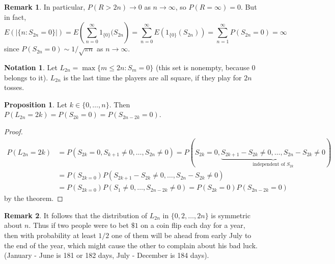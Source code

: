 \documentclass{article}
\theoremstyle{definition}
\newtheorem{proposition}[theorem]{Proposition}
\newtheorem*{remark}{Remark}
\newtheorem*{notation}{Notation}
\begin{document}
\begin{remark}
In particular, $P(R > 2n) \to 0$ as $n \to \infty$, so $P(R = \infty) = 0$. But in fact,
\[
    E(|\{n : S_{2n} = 0\}|) = E\left(\sum_{n=0}^\infty 1_{\{0\}}(S_{2n}\right) = \sum_{n=0}^\infty E(1_{\{0\}}(S_{2n})) = \sum_{n=1}^\infty P(S_{2n} = 0) = \infty
\]
since $P(S_{2n} = 0) \sim 1/\sqrt{\pi n}$ as $n \to \infty$.
\end{remark}

\begin{notation}
Let $L_{2n} = \max\{m \leq 2n : S_m = 0\}$ (this set is nonempty, because 0 belongs to it). $L_{2n}$ is the last time the players are all square, if they play for $2n$ tosses.
\end{notation}

\begin{proposition}
    Let $k \in \{0, \dots, n\}$. Then $P(L_{2n} = 2k) = P(S_{2k} = 0) = P(S_{2n - 2k} = 0)$.
\end{proposition}
\begin{proof}
    \begin{align*}
        P(L_{2n} = 2k) &= P(S_{2k} = 0, S_{k+1} \neq 0, \dots, S_{2n} \neq 0) = P(S_{2k} = 0, \underbrace{S_{2k+1} - S_{2k} \neq 0, \dots, S_{2n} - S_{2k} \neq 0}_{\text{independent of } S_{2k}}) \\
        &= P(S_{2k = 0})P(S_{2k+1} - S_{2k} \neq 0, \dots, S_{2n} - S_{2k} \neq 0) \\
        &= P(S_{2k = 0})P(S_1 \neq 0, \dots, S_{2n-2k} \neq 0) = P(S_{2k} = 0)P(S_{2n-2k} = 0)
    \end{align*}
    by the theorem.
\end{proof}

\begin{remark}
It follows that the distribution of $L_{2n}$ in $\{0, 2, \dots, 2n\}$ is symmetric about $n$. Thus if two people were to bet $\$1$ on a coin flip each day for a year, then with probability at least $1/2$ one of them will be ahead from early July to the end of the year, which might cause the other to complain about his bad luck. (January - June is 181 or 182 days, July - December is 184 days).
\end{remark}
\end{document}
